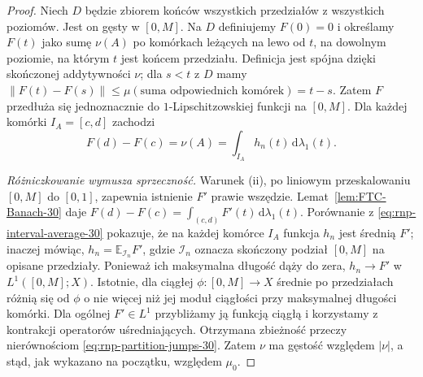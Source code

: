 \documentclass[11pt,a4paper,oneside]{book}
\numberwithin{equation}{chapter}
\theoremstyle{plain}
\theoremstyle{definition}
\theoremstyle{remark}
\begin{document}
\begin{proof}
Niech $D$ będzie zbiorem końców wszystkich
przedziałów z wszystkich poziomów. Jest on
gęsty w $[0,M]$. Na $D$ definiujemy $F(0)=0$
i określamy $F(t)$ jako sumę $\nu(A)$ po
komórkach leżących na lewo od $t$, na dowolnym
poziomie, na którym $t$ jest końcem przedziału.
Definicja jest spójna dzięki skończonej addytywności
$\nu$; dla $s<t$ z $D$ mamy
$\|F(t)-F(s)\|\le\mu(\text{suma odpowiednich komórek})
=t-s$. Zatem $F$ przedłuża się jednoznacznie
do $1$-Lipschitzowskiej funkcji na $[0,M]$.
Dla każdej komórki $I_A=[c,d]$ zachodzi
\begin{equation}\label{eq:rnp-interval-average-30}
 F(d)-F(c)=\nu(A)
 =\int_{I_A}h_n(t)\,\mathrm d\lambda_1(t).
\end{equation}

\emph{Różniczkowanie wymusza sprzeczność.}
Warunek (ii), po liniowym przeskalowaniu $[0,M]$
do $[0,1]$, zapewnia istnienie $F'$ prawie wszędzie.
Lemat~\ref{lem:FTC-Banach-30} daje
$F(d)-F(c)=\int_{(c,d)}F'(t)\,\mathrm d\lambda_1(t)$.
Porównanie z \eqref{eq:rnp-interval-average-30}
pokazuje, że na każdej komórce $I_A$ funkcja $h_n$
jest średnią $F'$; inaczej mówiąc,
$h_n=\mathbb E_{\mathcal I_n}F'$,
gdzie $\mathcal I_n$ oznacza skończony podział
$[0,M]$ na opisane przedziały.
Ponieważ ich maksymalna długość dąży do zera,
$h_n\to F'$ w $L^1([0,M];X)$. Istotnie, dla ciągłej
$\phi:[0,M]\to X$ średnie po przedziałach różnią się
od $\phi$ o nie więcej niż jej moduł ciągłości
przy maksymalnej długości komórki. Dla ogólnej
$F'\in L^1$ przybliżamy ją funkcją ciągłą i
korzystamy z kontrakcji operatorów uśredniających.
Otrzymana zbieżność przeczy nierównościom
\eqref{eq:rnp-partition-jumps-30}. Zatem $\nu$
ma gęstość względem $|\nu|$, a stąd, jak wykazano
na początku, względem $\mu_0$.
\end{proof}
\end{document}
